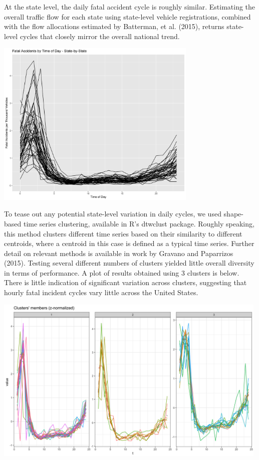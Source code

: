 \documentclass[11pt, oneside]{article}   	%
\begin{document}
At the state level, the daily fatal accident cycle is roughly similar. Estimating the overall traffic flow for each state using state-level vehicle registrations, combined with the flow allocations estimated by Batterman, et al. (2015), returns state-level cycles that closely mirror the overall national trend.

\begin{center}
\includegraphics[width=.75\textwidth, height=8cm,keepaspectratio]{WeightedStatePlot.png}
\end{center}

To tease out any potential state-level variation in daily cycles, we used shape-based time series clustering, available in R's dtwclust package. Roughly speaking, this method clusters different time series based on their similarity to different centroids, where a centroid in this case is defined as a typical time series. Further detail on relevant methods is available in work by Gravano and Paparrizos (2015). Testing several different numbers of clusters yielded little overall diversity in terms of performance. A plot of results obtained using 3 clusters is below. There is little indication of significant variation across clusters, suggesting that hourly fatal incident cycles vary little across the United States.

\begin{center}
\includegraphics[width=.75\textwidth,height=8cm,keepaspectratio]{StateClusterPlot_Hourly.png}
\end{center}
\end{document}
